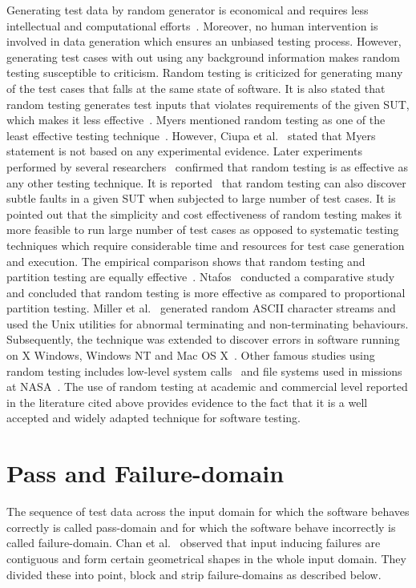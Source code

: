 Generating test data by random generator is economical and requires less intellectual and computational efforts~\cite{ciupa2008artoo}. Moreover, no human intervention is involved in data generation which ensures an unbiased testing process. However, generating test cases with out using any background information makes random testing susceptible to criticism. Random testing is criticized for generating many of the test cases that falls at the same state of software. It is also stated that random testing generates test inputs that violates requirements of the given SUT, which makes it less effective~\cite{pacheco2009directed, sen2007effective}. Myers mentioned random testing as one of the least effective testing technique~\cite{myers2011art}. However, Ciupa et al.~\cite{ciupa2007experimental} stated that Myers statement is not based on any experimental evidence. Later experiments performed by several researchers~\cite{ciupa2008finding, hamlet1994random,  leitner2007efficient} confirmed that random testing is as effective as any other testing technique. It is reported~\cite{duran1981report} that random testing can also discover subtle faults in a given SUT when subjected to large number of test cases. It is pointed out that the simplicity and cost effectiveness of random testing makes it more feasible to run large number of test cases as opposed to systematic testing techniques which require considerable time and resources for test case generation and execution. The empirical comparison shows that random testing and partition testing are equally effective~\cite{hamlet1990partition}. Ntafos~\cite{ntafos1998random} conducted a comparative study and concluded that random testing is more effective as compared to proportional partition testing. Miller et al.~\cite{miller1990empirical} generated random ASCII character streams and used the Unix utilities for abnormal terminating and non-terminating behaviours. Subsequently, the technique was extended to discover errors in software running on X Windows, Windows NT and Mac OS X~\cite{forrester2000empirical, miller2006empirical}. Other famous studies using random testing includes low-level system calls~\cite{kropp1998automated} and file systems used in missions at NASA~\cite{groce2007randomized}. The use of random testing at academic and commercial level reported in the literature cited above provides evidence to the fact that it is a well accepted and widely adapted technique for software testing.



\section{Pass and Failure-domain} \label{sec:failuredomains_2}
\label{sec:genuineandfailuredomain}
The sequence of test data across the input domain for which the software behaves correctly is called pass-domain and for which the software behave incorrectly is called failure-domain. Chan et al.~\cite{chan1996proportional} observed that input inducing failures are contiguous and form certain geometrical shapes in the whole input domain. They divided these into point, block and strip failure-domains as described below.

